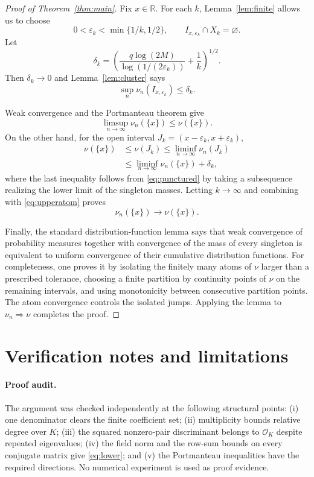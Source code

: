 \documentclass[11pt]{article}
\theoremstyle{definition}
\theoremstyle{remark}
\newcommand{\R}{\mathbb{R}}
\newcommand{\OK}{\mathcal{O}_K}
\begin{document}
\begin{proof}[Proof of Theorem~\ref{thm:main}]
Fix $x\in\R$.  For each $k$, Lemma~\ref{lem:finite} allows us to choose
\[
  0<\varepsilon_k<\min\{1/k,1/2\},
  \qquad
  I_{x,\varepsilon_k}\cap X_k=\varnothing .
\]
Let
\[
 \delta_k=
 \left(
 \frac{q\log(2M)}{\log(1/(2\varepsilon_k))}+\frac1k
 \right)^{1/2}.
\]
Then $\delta_k\to0$ and Lemma~\ref{lem:cluster} says
\[
          \sup_n\nu_n(I_{x,\varepsilon_k})\le\delta_k.
\tag{5}\label{eq:punctured}
\]

Weak convergence and the Portmanteau theorem give
\[
 \limsup_{n\to\infty}\nu_n(\{x\})\le\nu(\{x\}).
\tag{6}\label{eq:upperatom}
\]
On the other hand, for the open interval
$J_k=(x-\varepsilon_k,x+\varepsilon_k)$,
\[
\begin{aligned}
\nu(\{x\})
&\le \nu(J_k)
 \le \liminf_{n\to\infty}\nu_n(J_k)\\
&\le \liminf_{n\to\infty}\nu_n(\{x\})+\delta_k,
\end{aligned}
\]
where the last inequality follows from \eqref{eq:punctured} by taking a
subsequence realizing the lower limit of the singleton masses.  Letting
$k\to\infty$ and combining with \eqref{eq:upperatom} proves
\[
                    \nu_n(\{x\})\longrightarrow\nu(\{x\}).
\]

Finally, the standard distribution-function lemma says that weak convergence
of probability measures together with convergence of the mass of every
singleton is equivalent to uniform convergence of their cumulative
distribution functions.  For completeness, one proves it by isolating the
finitely many atoms of $\nu$ larger than a prescribed tolerance, choosing a
finite partition by continuity points of $\nu$ on the remaining intervals,
and using monotonicity between consecutive partition points.  The atom
convergence controls the isolated jumps.  Applying the lemma to
$\nu_n\Rightarrow\nu$ completes the proof.
\end{proof}

\section{Verification notes and limitations}

\paragraph{Proof audit.}
The argument was checked independently at the following structural points:
(i) one denominator clears the finite coefficient set; (ii) multiplicity
bounds relative degree over $K$; (iii) the squared nonzero-pair
discriminant belongs to $\OK$ despite repeated eigenvalues; (iv) the field
norm and the row-sum bounds on every conjugate matrix give
\eqref{eq:lower}; and (v) the Portmanteau inequalities have the required
directions.  No numerical experiment is used as proof evidence.
\end{document}
